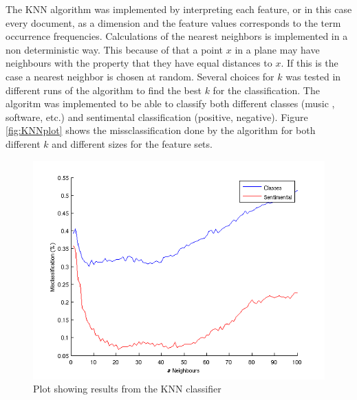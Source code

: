 The KNN algorithm was implemented by interpreting each feature, or in this case
every document, as a dimension and the feature values corresponds to the term
occurrence frequencies. Calculations of the nearest neighbors is
implemented in a non deterministic way. This because of that a point $x$ in a plane
may have neighbours with the property that they have equal distances to
$x$. If this is the case a nearest neighbor is chosen at random. Several choices
for $k$ was tested in different runs of the algorithm to find the best $k$ for
the classification. The algoritm was implemented to be able to classify both
different classes (music , software, etc.) and sentimental classification
(positive, negative). Figure \ref{fig:KNNplot} shows the missclassification done by the
algorithm for both different $k$ and different sizes for the feature sets.
\begin{figure}[h!]
\begin{center}
\caption{Plot showing results from the KNN classifier}
\includegraphics[scale=0.6]{fig/knn_2000words_testdata100_unigram}
\end{center}
\end{figure}
\label{fig:KNNplot}

%
